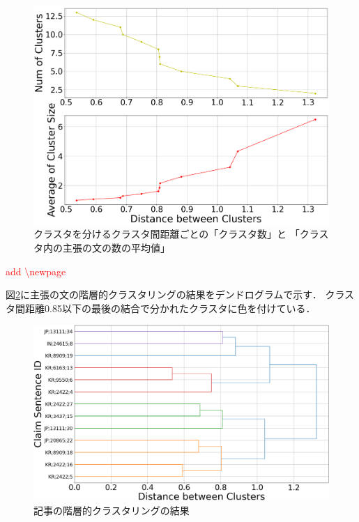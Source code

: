 \documentclass[12pt,a4j]{jreport}
\begin{document}
\begin{figure}[H]
	\centering
	\includegraphics[keepaspectratio, width=120mm]{img/process-07_sentences-cluster_from-cluster-230_with-threshold-85_threshold-dependencies_reduced-data-to-5000_Trim.png}
	\caption{クラスタを分けるクラスタ間距離ごとの「クラスタ数」と
  「クラスタ内の主張の文の数の平均値」}
	\label{num_and_size_of_clusters_of_sentences}
\end{figure}

\textcolor{red}{add \textbackslash newpage}
\newpage

図\ref{sentences_dendrogram}に主張の文の階層的クラスタリングの結果をデンドログラムで示す．
クラスタ間距離0.85以下の最後の結合で分かれたクラスタに色を付けている．

\begin{figure}[H]
	\centering
	\includegraphics[keepaspectratio, width=120mm]{img/process-07_sentences-cluster_from-cluster-230_with-threshold-85_color_dendrogram_reduced-data-to-5000_y-120_Trim.png}
	\caption{記事の階層的クラスタリングの結果}
	\label{sentences_dendrogram}
\end{figure}
\end{document}
